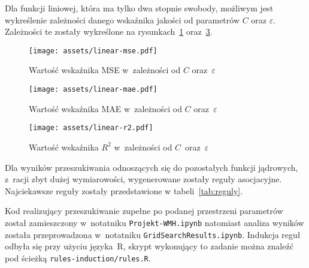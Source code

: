 Dla funkcji liniowej, która ma tylko dwa stopnie swobody, możliwym jest wykreślenie zależności danego wskaźnika jakości od parametrów $C$ oraz $\varepsilon$. Zależności te zostały wykreślone na rysunkach~\ref{fig:linear-mse} oraz~\ref{fig:linear-r2}.

\begin{figure}[htb]
    \centering
    \texttt{[image: assets/linear-mse.pdf]}
    \caption{Wartość wskaźnika MSE w~zależności od $C$ oraz~$\varepsilon$}
    \label{fig:linear-mse}
\end{figure}

\begin{figure}[htb]
    \centering
    \texttt{[image: assets/linear-mae.pdf]}
    \caption{Wartość wskaźnika MAE w~zależności od $C$ oraz~$\varepsilon$}
    \label{fig:linear-mae}
\end{figure}

\begin{figure}[htb]
    \centering
    \texttt{[image: assets/linear-r2.pdf]}
    \caption{Wartość wskaźnika $R^2$ w~zależności od $C$~oraz~$\varepsilon$}
    \label{fig:linear-r2}
\end{figure}

Dla wyników przeszukiwania odnoszących się do pozostałych funkcji jądrowych, z~racji zbyt dużej wymiarowości, wygenerowane zostały reguły asocjacyjne. Najciekawsze reguły zostały przedstawione w tabeli~\ref{tab:reguly}.

Kod realizujący przeszukiwanie zupełne po podanej przestrzeni parametrów został zamieszczony w~notatniku \texttt{Projekt-WMH.ipynb} natomiast analiza wyników została przeprowadzona w~notatniku \texttt{GridSearchResults.ipynb}. Indukcja reguł odbyła się przy użyciu języka~R, skrypt wykonujący to zadanie można znaleźć pod ścieżką \texttt{rules-induction/rules.R}.

